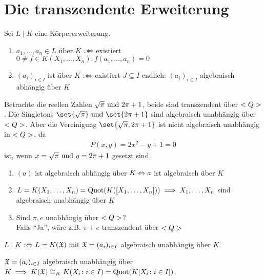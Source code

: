 \section{Die transzendente Erweiterung}
Sei $L\mid K$ eine Körpererweiterung.
\begin{definition}
	\begin{enumerate}
		\item $a_1, \dots, a_n \in L$  über $K$ $: \Leftrightarrow $ existiert \\$0 \neq f \in K(X_1,\dots, X_n) \colon f(a_1, \dots, a_n) = 0$
		\item $(a_i)_{i\in I}$ ist  über $K$ $:\Leftrightarrow$ existiert $J \subseteq I$ endlich: $(a_i)_{i\in I}$ algebraisch abhängig über $K$
	\end{enumerate}
\end{definition}
\begin{*example}
	Betrachte die reellen Zahlen $\sqrt{\pi} \text{ und } 2\pi +1$, beide sind transzendent über $<Q>$. Die Singletons $\set{\sqrt{\pi}}\und \set{2\pi +1}$ sind algebraisch unabhängig über $<Q>$. Aber die Vereinigung $\set{\sqrt{\pi}, 2\pi +1}$ ist nicht algebraisch unabhängig in $<Q>$, da
	\begin{align*}
		P(x,y) = 2x^2 - y + 1 = 0
	\end{align*}
	ist, wenn $x = \sqrt{\pi} \text{ und } y = 2\pi +1$ gesetzt sind.
\end{*example}
\begin{remark}
	\begin{enumerate}
		\item $(a)$ ist algebraisch abhängig über $K \Leftrightarrow a$ ist algebraisch über $K$
		\item $L = K(X_1,\dots, X_n) = \operatorname{Quot}(K([X_1,\dots, X_n])) \implies X_1,\dots, X_n$ sind algebraisch unabhängig über $K$
		\item Sind $\pi, e$ unabhängig über $<Q>$?\\
		Falls ``Ja'', wäre z.B. $\pi+e$ transzendent über $<Q>$
	\end{enumerate}
\end{remark}
\begin{definition}
	$L \mid K$  $:\Leftrightarrow L = K(\mathfrak{X}) \text{ mit } \mathfrak{X} = (a_i)_{i\in I}$ algebraisch unabhängig über $K$.
\end{definition}
\begin{lemma}
	$\mathfrak{X} = (a_i)_{i \in I}$ algebraisch unabhängig über $K \implies K(\mathfrak{X}) \cong_K K(X_i \colon i \in I) = \operatorname{Quot}(K[X_i \colon i \in I])$. 
\end{lemma}
